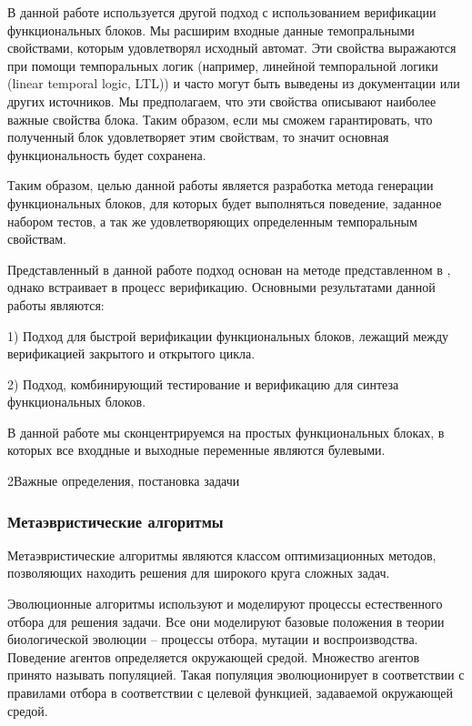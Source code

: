 \documentclass[14pt]{extarticle}
\makeatletter
\theoremstyle{plain}
\theoremstyle{definition}
\renewcommand{\subsection}{\@startsection{subsection}{2}{0mm}%
{2\baselineskip}{\baselineskip}{\bfseries\large\itshape}}
\makeatother
\begin{document}
В данной работе используется другой подход с использованием верификации
функциональных блоков. Мы расширим входные данные темопральными свойствами,
которым удовлетворял исходный автомат. Эти свойства выражаются при помощи
темпоральных логик (например, линейной темпоральной логики (linear temporal logic, LTL)) и часто могут быть
выведены из документации или других источников. Мы предполагаем, что эти
свойства описывают наиболее важные свойства блока. Таким образом, если мы
сможем гарантировать, что полученный блок удовлетворяет этим свойствам, то
значит основная функциональность будет сохранена.

Таким образом, целью данной работы является разработка метода генерации
функциональных блоков, для которых будет выполняться поведение, заданное
набором тестов, а так же удовлетворяющих определенным темпоральным свойствам.

Представленный в данной работе подход основан на методе представленном в \cite{rec},
однако встраивает в процесс верификацию. Основными результатами данной работы
являются:

1) Подход для быстрой верификации функциональных блоков, лежащий между
верификацией закрытого и открытого цикла.

2) Подход, комбинирующий тестирование и верификацию для синтеза функциональных
блоков.

В данной работе мы сконцентрируемся на простых функциональных блоках, в которых
все входдные и выходные переменные являются булевыми.

\pagebreak

\subsection{Важные определения, постановка задачи}

\subsubsection{Метаэвристические алгоритмы}

Метаэвристические алгоритмы являются классом оптимизационных методов,
позволяющих находить решения для широкого круга сложных задач.

Эволюционные алгоритмы используют и моделируют процессы естественного отбора
для решения задачи. Все они моделируют базовые положения в теории биологической
эволюции -- процессы отбора, мутации и воспроизводства. Поведение агентов
определяется окружающей средой. Множество агентов принято называть популяцией.
Такая популяция эволюционирует в соответствии с правилами отбора в соответствии
с целевой функцией, задаваемой окружающей средой.
\end{document}
